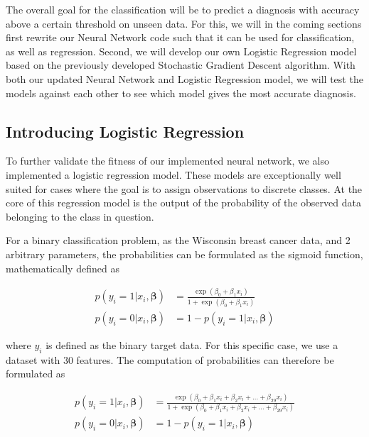 \documentclass
[twocolumn,
secnumarabic,
nobibnotes,
aps,
prl,
reprint,
groupedaddress,
amsmath,
amssymb
]{revtex4-2}
\begin{document}
The overall goal for the classification will be to predict a diagnosis with accuracy above a certain threshold on unseen data. For this, we will in the coming sections first rewrite our Neural Network code such that it can be used for classification, as well as regression. Second, we will develop our own Logistic Regression model based on the previously developed Stochastic Gradient Descent algorithm. With both our updated Neural Network and Logistic Regression model, we will test the models against each other to see which model gives the most accurate diagnosis.

\subsection{Introducing Logistic Regression}
To further validate the fitness of our implemented neural network, we also implemented a logistic regression model.  These models are exceptionally well suited for cases where the goal is to assign observations to discrete classes. At the core of this regression model is the output of the probability of  the observed data belonging to the class in question.

For a binary classification problem, as the Wisconsin breast cancer data, and 2 arbitrary parameters, the probabilities can be formulated as the sigmoid function, mathematically defined as

\begin{equation}
  \begin{aligned}
    \nonumber
    p(y_i=1|x_i,\bm{\beta}) & = \frac{\exp{(\beta_0+\beta_1x_i)}}{1+\exp{(\beta_0+\beta_1x_i)}} \\
    p(y_i=0|x_i,\bm{\beta}) & = 1 - p(y_i=1|x_i,\bm{\beta})
  \end{aligned}
\end{equation}

where $y_i$ is defined as the binary target data. For this specific case, we use a dataset with 30 features. The computation of probabilities can therefore be formulated as

\begin{equation}
  \begin{aligned}
    \nonumber
    p(y_i=1|x_i,\bm{\beta}) & = \frac{\exp{(\beta_0+\beta_1x_i + \beta_2x_i + \ldots +\beta_{29}x_i)}}{1+\exp{(\beta_0+\beta_1x_i + \beta_2x_i + \ldots +\beta_{29}x_i)}} \\
    p(y_i=0|x_i,\bm{\beta}) & = 1 - p(y_i=1|x_i,\bm{\beta})
  \end{aligned}
\end{equation}
\end{document}
